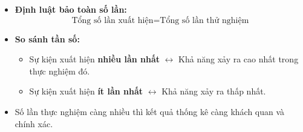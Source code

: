 \documentclass[14pt,a4paper,oneside]{extbook}
\begin{document}
\begin{minipage}[t]{0.49\textwidth}\vspace{0pt}
\begin{tcolorbox}[
  enhanced,
  colback=teal!4!white,
  colframe=teal!75!black,
  arc=2mm, boxrule=0.8pt,
  left=2mm, right=2mm, top=1.8mm, bottom=1.8mm,
  title={\footnotesize\bfseries\color{white}\faCheckSquareO\ 2. Nhận xét khả năng xảy ra}
]
{\footnotesize
\begin{itemize}\setlength{\itemsep}{1pt}\setlength{\leftskip}{-2.5mm}
  \item \textbf{Định luật bảo toàn số lần:}
  $$\text{Tổng số lần xuất hiện} = \text{Tổng số lần thử nghiệm}$$
  \item \textbf{So sánh tần số:}
  \begin{itemize}\setlength{\itemsep}{0.5pt}\setlength{\leftskip}{-2.5mm}
    \item Sự kiện xuất hiện \textbf{nhiều lần nhất} $\leftrightarrow$ Khả năng xảy ra cao nhất trong thực nghiệm đó.
    \item Sự kiện xuất hiện \textbf{ít lần nhất} $\leftrightarrow$ Khả năng xảy ra thấp nhất.
  \end{itemize}
  \item Số lần thực nghiệm càng nhiều thì kết quả thống kê càng khách quan và chính xác.
\end{itemize}
}
\end{tcolorbox}
\end{minipage}
\end{document}
